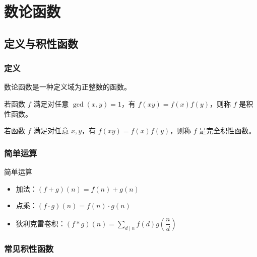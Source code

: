 \documentclass[../main.tex]{subfiles}
\begin{document}
\section{数论函数}

\subsection{定义与积性函数}

\subsubsection{定义}

\begin{frame}
\begin{defi}[数论函数]
数论函数是一种定义域为正整数的函数。
\end{defi}\pause

\begin{defi}[积性函数]
若函数 $f$ 满足对任意 $\gcd(x,y)=1$，有 $f(xy)=f(x)f(y)$，则称 $f$ 是积性函数。\pause

若函数 $f$ 满足对任意 $x,y$，有 $f(xy)=f(x)f(y)$，则称 $f$ 是完全积性函数。
\end{defi}
\end{frame}

\subsubsection{简单运算}

\begin{frame}{简单运算}
\begin{itemize}
\item 加法：$(f+g)(n)=f(n)+g(n)$\pause
\medskip
\item 点乘：$(f\cdot g)(n)=f(n)\cdot g(n)$\pause
\medskip
\item 狄利克雷卷积：$(f*g)(n)=\sum\limits_{d\mid n}f(d)g(\dfrac{n}{d})$
\end{itemize}
\end{frame}

\subsubsection{常见积性函数}
\end{document}
